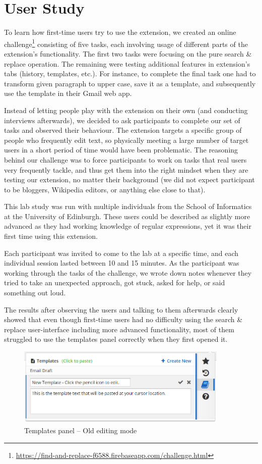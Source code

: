 \documentclass[bsc,frontabs,twoside,singlespacing,parskip,deptreport]{infthesis}
\begin{document}
\section{User Study}
To learn how first-time users try to use the extension, we created an online challenge\footnote{\url{https://find-and-replace-f6588.firebaseapp.com/challenge.html}} consisting of five tasks, each involving usage of different parts of the extension's functionality. The first two tasks were focusing on the pure search \& replace operation. The remaining were testing additional features in extension's tabs (history, templates, etc.). For instance, to complete the final task one had to transform given paragraph to upper case, save it as a template, and subsequently use the template in their Gmail web app.

Instead of letting people play with the extension on their own (and conducting interviews afterwards), we decided to ask participants to complete our set of tasks and observed their behaviour. The extension targets a specific group of people who frequently edit text, so physically meeting a large number of target users in a short period of time would have been problematic. The reasoning behind our challenge was to force participants to work on tasks that real users very frequently tackle, and thus get them into the right mindset when they are testing our extension, no matter their background (we did not expect participant to be bloggers, Wikipedia editors, or anything else close to that).

This lab study was run with multiple individuals from the School of Informatics at the University of Edinburgh. These users could be described as slightly more advanced as they had working knowledge of regular expressions, yet it was their first time using this extension.

Each participant was invited to come to the lab at a specific time, and each individual session lasted between 10 and 15 minutes. As the participant was working through the tasks of the challenge, we wrote down notes whenever they tried to take an unexpected approach, got stuck, asked for help, or said something out loud.

The results after observing the users and talking to them afterwards clearly showed that even though first-time users had no difficulty using the search \& replace user-interface including more advanced functionality, most of them struggled to use the templates panel correctly when they first opened it. 

\begin{figure}[h]
\centering
\includegraphics[width=0.9\textwidth]{../docs/template-edit-mode-old.png}
\caption{Templates panel -- Old editing mode}
\end{figure}
\end{document}
